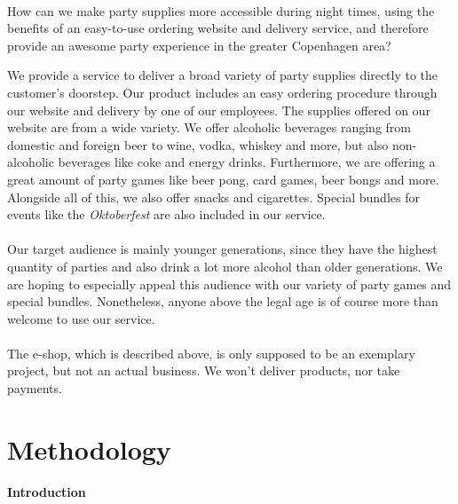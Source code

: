 \documentclass[12p]{article}
\begin{document}
\begin{center}
    \vspace{1em}
    \SlimHRule\\[0.1cm]
    \Large{How can we make party supplies more accessible during night times, using the benefits of an easy-to-use ordering website and delivery service, and therefore provide an awesome party experience in the greater Copenhagen area?}
    \SlimHRule\\[0.1cm]
    \vspace{1em}
\end{center}

We provide a service to deliver a broad variety of party supplies directly to the customer's doorstep. Our product includes an easy ordering procedure through our website and delivery by one of our employees. The supplies offered on our website are from a wide variety. We offer alcoholic beverages ranging from domestic and foreign beer to wine, vodka, whiskey and more, but also non-alcoholic beverages like coke and energy drinks. Furthermore, we are offering a great amount of party games like beer pong, card games, beer bongs and more. Alongside all of this, we also offer snacks and cigarettes. Special bundles for events like the \emph{Oktoberfest} are also included in our service.
\\ \\
Our target audience is mainly younger generations, since they have the highest quantity of parties and also drink a lot more alcohol than older generations. We are hoping to especially appeal this audience with our variety of party games and special bundles. Nonetheless, anyone above the legal age is of course more than welcome to use our service.
\\ \\
The e-shop, which is described above, is only supposed to be an exemplary project, but not an actual business. We won't deliver products, nor take payments.


\newpage
\section{Methodology} \label{Methodology}

\textbf{Introduction}
\end{document}
